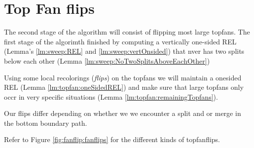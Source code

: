 
\section{Top Fan flips}
\label{s:fanflip}

The second stage of the algorithm will consist of flipping most large topfans. The first stage of the algorimth finished by computing a vertically one-sided REL (Lemma's \ref{lm:sweep:REL} and \ref{lm:sweep:vertOnsided}) that nver has two splits below each other (Lemma \ref{lm:sweep:NoTwoSplitsAboveEachOther})

Using some local recolorings (\emph{flips}) on the topfans we will maintain a onesided REL (Lemma \ref{lm:topfan:oneSidedREL}) and make sure that large topfans only occr in very specific situations (Lemma \ref{lm:topfan:remainingTopfans}).


Our flips differ depending on whether we we encounter a split and or merge in the bottom boundary path.


Refer to Figure \ref{fig:fanflip:fanflips} for the different kinds of topfanflips.


